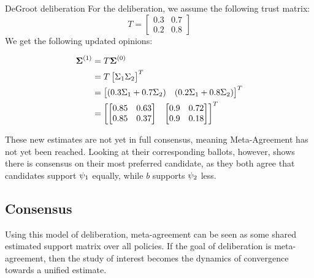 \begin{example}{DeGroot deliberation} {}
	For the deliberation, we assume the following trust matrix:
	\[
		T= \begin{bmatrix}
			0.3 & 0.7 \\
			0.2 & 0.8
		\end{bmatrix}
	\]
	We get the following updated opinions:

	\begin{align*}
		\boldsymbol{\boldsymbol{\Sigma}}^{(1)}
		 & =
		T\boldsymbol{\boldsymbol{\Sigma}}^{(0)}
		\\ &
		=T\begin{bmatrix}\Sigma_1
			  \Sigma_2\end{bmatrix}^{T}
		\\ &
		=\begin{bmatrix}(0.3\Sigma_1
			 + 0.7\Sigma_{2}) &
			 (0.2\Sigma_1 +
			 0.8\Sigma_{2})\end{bmatrix}^{T} \\
		 & = \begin{bmatrix}
			     \begin{bmatrix}
				0.85 & 0.63
				\\
				0.85 & 0.37\end{bmatrix}
			      &
			     \begin{bmatrix}
				0.9 & 0.72
				\\ 0.9 & 0.18 \\
			\end{bmatrix}
		     \end{bmatrix}^{T}
	\end{align*}

	These new estimates are not yet in full consensus, meaning Meta-Agreement has not yet been reached.  Looking at their
	corresponding ballots, however, shows there is consensus on their most preferred candidate,
	as they both agree that candidates support $\psi_1$ equally, while $b$
	supports $\psi_2$ less.

	\label{example:deGroot-delib}
\end{example}


\subsection{Consensus} \label{sub: concensus DeGroot}


Using this model of deliberation, meta-agreement can be seen as some shared estimated
support matrix over all policies. If the goal of deliberation is
meta-agreement, then the study of interest becomes the dynamics of convergence
towards a unified estimate. 

